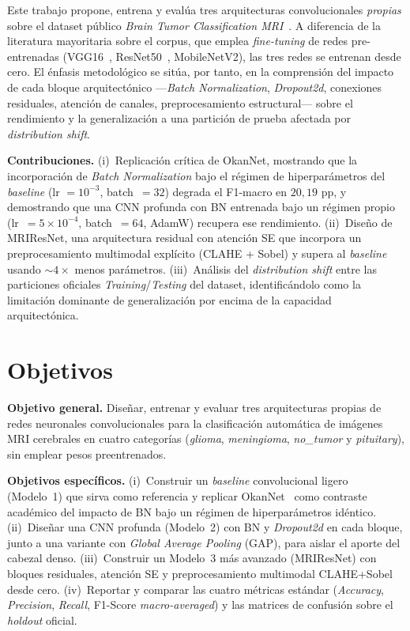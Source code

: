 \documentclass[conference]{IEEEtran}
\begin{document}
Este trabajo propone, entrena y evalúa tres arquitecturas
convolucionales \emph{propias} sobre el dataset público
\textit{Brain Tumor Classification MRI}~\cite{sartaj2020dataset}.
A diferencia de la literatura mayoritaria sobre el corpus, que
emplea \textit{fine-tuning} de redes pre-entrenadas
(VGG16~\cite{simonyan2014very}, ResNet50~\cite{he2016resnet},
MobileNetV2), las tres redes se entrenan desde cero. El énfasis
metodológico se sitúa, por tanto, en la comprensión del impacto
de cada bloque arquitectónico ---\textit{Batch Normalization},
\textit{Dropout2d}, conexiones residuales, atención de canales,
preprocesamiento estructural--- sobre el rendimiento y la
generalización a una partición de prueba afectada por
\textit{distribution shift}.

\textbf{Contribuciones.} (i)~Replicación crítica de OkanNet,
mostrando que la incorporación de \textit{Batch Normalization}
bajo el régimen de hiperparámetros del \textit{baseline} (lr
$=10^{-3}$, batch~$=32$) degrada el F1-macro en $20{,}19$ pp,
y demostrando que una CNN profunda con BN entrenada bajo un
régimen propio (lr~$=5{\times}10^{-4}$, batch~$=64$, AdamW)
recupera ese rendimiento. (ii)~Diseño de MRIResNet, una
arquitectura residual con atención SE que incorpora un
preprocesamiento multimodal explícito (CLAHE + Sobel) y supera
al \textit{baseline} usando $\sim 4{\times}$ menos parámetros.
(iii)~Análisis del \textit{distribution shift} entre las
particiones oficiales \textit{Training}/\textit{Testing} del
dataset, identificándolo como la limitación dominante de
generalización por encima de la capacidad arquitectónica.

\section{Objetivos}

\textbf{Objetivo general.} Diseñar, entrenar y evaluar tres
arquitecturas propias de redes neuronales convolucionales para
la clasificación automática de imágenes MRI cerebrales en cuatro
categorías (\textit{glioma}, \textit{meningioma},
\textit{no\_tumor} y \textit{pituitary}), sin emplear pesos
preentrenados.

\textbf{Objetivos específicos.}
(i)~Construir un \textit{baseline} convolucional ligero (Modelo~1)
que sirva como referencia y replicar OkanNet~\cite{okannet2026}
como contraste académico del impacto de BN bajo un régimen de
hiperparámetros idéntico.
(ii)~Diseñar una CNN profunda (Modelo~2) con BN y
\textit{Dropout2d} en cada bloque, junto a una variante con
\textit{Global Average Pooling} (GAP), para aislar el aporte
del cabezal denso.
(iii)~Construir un Modelo~3 más avanzado (MRIResNet)
con bloques residuales, atención SE y preprocesamiento
multimodal CLAHE+Sobel desde cero.
(iv)~Reportar y comparar las cuatro métricas estándar
(\textit{Accuracy}, \textit{Precision}, \textit{Recall},
F1-Score \textit{macro-averaged}) y las matrices de confusión
sobre el \textit{holdout} oficial.
\end{document}
